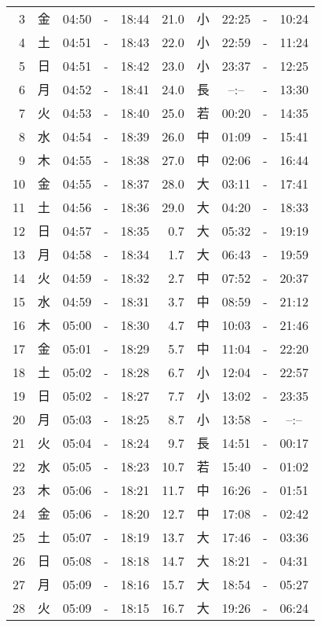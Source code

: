 \documentclass[a4j,10pt]{jsarticle}
\begin{document}
\begin{center}
\begin{table}[ht]
\begin{center}
\begin{tabular}{|rc|ccc|rc|ccc|}
  3 & 金 & 04:50 &-& 18:44 & 21.0 & 小 & 22:25 &-& 10:24 \\
  4 & 土 & 04:51 &-& 18:43 & 22.0 & 小 & 22:59 &-& 11:24 \\
  5 & 日 & 04:51 &-& 18:42 & 23.0 & 小 & 23:37 &-& 12:25 \\
  6 & 月 & 04:52 &-& 18:41 & 24.0 & 長 & --:-- &-& 13:30 \\
  7 & 火 & 04:53 &-& 18:40 & 25.0 & 若 & 00:20 &-& 14:35 \\
  8 & 水 & 04:54 &-& 18:39 & 26.0 & 中 & 01:09 &-& 15:41 \\
  9 & 木 & 04:55 &-& 18:38 & 27.0 & 中 & 02:06 &-& 16:44 \\
 10 & 金 & 04:55 &-& 18:37 & 28.0 & 大 & 03:11 &-& 17:41 \\
 11 & 土 & 04:56 &-& 18:36 & 29.0 & 大 & 04:20 &-& 18:33 \\
 12 & 日 & 04:57 &-& 18:35 &  0.7 & 大 & 05:32 &-& 19:19 \\
 13 & 月 & 04:58 &-& 18:34 &  1.7 & 大 & 06:43 &-& 19:59 \\
 14 & 火 & 04:59 &-& 18:32 &  2.7 & 中 & 07:52 &-& 20:37 \\
 15 & 水 & 04:59 &-& 18:31 &  3.7 & 中 & 08:59 &-& 21:12 \\
 16 & 木 & 05:00 &-& 18:30 &  4.7 & 中 & 10:03 &-& 21:46 \\
 17 & 金 & 05:01 &-& 18:29 &  5.7 & 中 & 11:04 &-& 22:20 \\
 18 & 土 & 05:02 &-& 18:28 &  6.7 & 小 & 12:04 &-& 22:57 \\
 19 & 日 & 05:02 &-& 18:27 &  7.7 & 小 & 13:02 &-& 23:35 \\
 20 & 月 & 05:03 &-& 18:25 &  8.7 & 小 & 13:58 &-& --:-- \\
 21 & 火 & 05:04 &-& 18:24 &  9.7 & 長 & 14:51 &-& 00:17 \\
 22 & 水 & 05:05 &-& 18:23 & 10.7 & 若 & 15:40 &-& 01:02 \\
 23 & 木 & 05:06 &-& 18:21 & 11.7 & 中 & 16:26 &-& 01:51 \\
 24 & 金 & 05:06 &-& 18:20 & 12.7 & 中 & 17:08 &-& 02:42 \\
 25 & 土 & 05:07 &-& 18:19 & 13.7 & 大 & 17:46 &-& 03:36 \\
 26 & 日 & 05:08 &-& 18:18 & 14.7 & 大 & 18:21 &-& 04:31 \\
 27 & 月 & 05:09 &-& 18:16 & 15.7 & 大 & 18:54 &-& 05:27 \\
 28 & 火 & 05:09 &-& 18:15 & 16.7 & 大 & 19:26 &-& 06:24 \\

\end{tabular}
\end{center}
\end{table}
\end{center}
\end{document}
